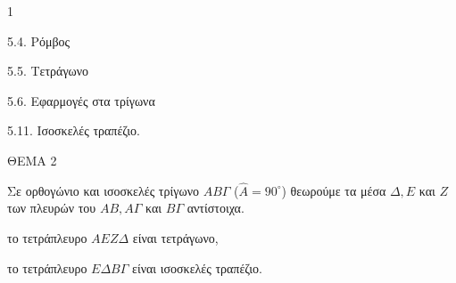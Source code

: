 \begin{ylh}{1}
    \item 5.4. Ρόμβος
    \item 5.5. Τετράγωνο
    \item 5.6. Εφαρμογές στα τρίγωνα
    \item 5.11. Ισοσκελές τραπέζιο.
\end{ylh}

ΘΕΜΑ 2

Σε ορθογώνιο και ισοσκελές τρίγωνο $AB\Gamma$ ($\widehat{A} = 90^{\circ}$) θεωρούμε τα μέσα $\Delta, E$ και $Z$ των πλευρών του $AB, A\Gamma$ και $B\Gamma$ αντίστοιχα.

\begin{alist}
\item το τετράπλευρο $AEZ\Delta$ είναι τετράγωνο, 
\item το τετράπλευρο $E\Delta B\Gamma$ είναι ισοσκελές τραπέζιο. 

\begin{center}
\end{center}
\end{alist}
